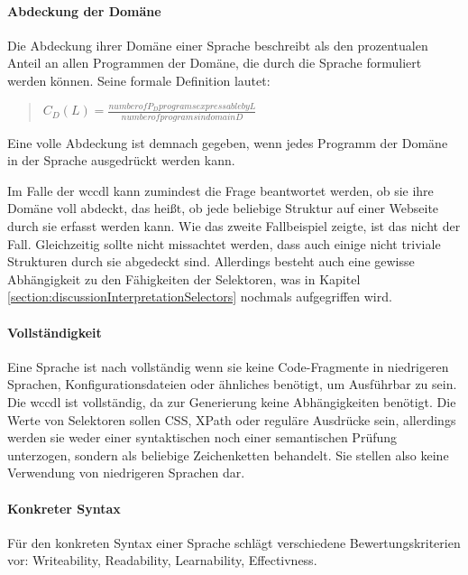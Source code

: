     \paragraph{Abdeckung der Domäne}
    Die Abdeckung ihrer Domäne einer Sprache beschreibt
    \citet[Kapitel 4.2]{voelter:DslEngineering} als den
    prozentualen Anteil an allen Programmen der Domäne,
    die durch die Sprache formuliert werden können.
    Seine formale Definition lautet:

    \begin{quote}
        $C_D(L) = \frac{number of P_D programs expressable by L}{number of programs in domain D}$
    \end{quote}

    Eine volle Abdeckung ist demnach gegeben,
    wenn jedes Programm der Domäne in der Sprache ausgedrückt werden kann.

    Im Falle der \gls{wccdl} kann zumindest die Frage beantwortet werden,
    ob sie ihre Domäne voll abdeckt, das heißt, ob jede beliebige Struktur auf einer Webseite
    durch sie erfasst werden kann.
    Wie das zweite Fallbeispiel zeigte, ist das nicht der Fall.
    Gleichzeitig sollte nicht missachtet werden,
    dass auch einige nicht triviale Strukturen durch sie abgedeckt sind.
    Allerdings besteht auch eine gewisse Abhängigkeit zu den Fähigkeiten der Selektoren,
    was in Kapitel \ref{section:discussionInterpretationSelectors}
    nochmals aufgegriffen wird.

    \paragraph{Vollständigkeit}
    Eine Sprache ist nach \citet[Kapitel 4.5]{voelter:DslEngineering}
    vollständig wenn sie keine Code-Fragmente in niedrigeren Sprachen,
    Konfigurationsdateien oder ähnliches benötigt,
    um Ausführbar zu sein.
    Die \gls{wccdl} ist vollständig, da zur Generierung keine Abhängigkeiten benötigt.
    Die Werte von Selektoren sollen CSS, XPath oder reguläre Ausdrücke sein,
    allerdings werden sie weder einer syntaktischen noch einer semantischen Prüfung unterzogen,
    sondern als beliebige Zeichenketten behandelt.
    Sie stellen also keine Verwendung von niedrigeren Sprachen dar.

    \paragraph{Konkreter Syntax}
    Für den konkreten Syntax einer Sprache schlägt \citet[Kapitel 4.7]{voelter:DslEngineering}
    verschiedene Bewertungskriterien vor: Writeability, Readability, Learnability, Effectivness.

